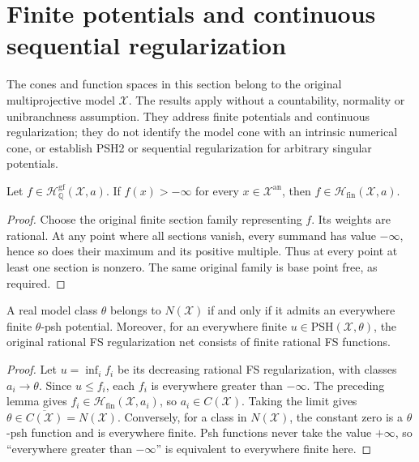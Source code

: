 \section{Finite potentials and continuous sequential regularization}
\label{sec:intrinsic-psh-continuation-seven}

The cones and function spaces in this section belong to the original
multiprojective model $\mathcal X$. The results apply without a countability,
normality or unibranchness assumption. They address finite potentials and
continuous regularization; they do not identify the model cone with an
intrinsic numerical cone, or establish PSH2 or sequential regularization
for arbitrary singular potentials.

\begin{lemma}
\label{lem:seven-finite-rational-fs}
\leanok
Let $f\in\mathcal H^{\mathrm{gf}}_{\mathbb Q}(\mathcal X,a)$.
If $f(x)>-\infty$ for every $x\in\mathcal X^{\mathrm{an}}$, then
$f\in\mathcal H_{\mathrm{fin}}(\mathcal X,a)$.
\end{lemma}
\begin{proof}
Choose the original finite section family representing $f$. Its weights
are rational. At any point where all sections vanish, every summand has
value $-\infty$, hence so does their maximum and its positive multiple.
Thus at every point at least one section is nonzero. The same original
family is base point free, as required.
\end{proof}

\begin{theorem}
\label{thm:seven-finite-psh-nef}
\leanok
A real model class $\theta$ belongs to $N(\mathcal X)$ if and only if it
admits an everywhere finite $\theta$-psh potential. Moreover, for an
everywhere finite $u\in\mathrm{PSH}(\mathcal X,\theta)$, the original
rational FS regularization net consists of finite rational FS functions.
\end{theorem}
\begin{proof}
Let $u=\inf_i f_i$ be its decreasing rational FS regularization,
with classes $a_i\to\theta$. Since $u\le f_i$, each $f_i$ is everywhere
greater than $-\infty$. The preceding lemma gives
$f_i\in\mathcal H_{\mathrm{fin}}(\mathcal X,a_i)$, so
$a_i\in C(\mathcal X)$. Taking the limit gives
$\theta\in\overline{C(\mathcal X)}=N(\mathcal X)$.
Conversely, for a class in $N(\mathcal X)$, the constant zero is a
$\theta$-psh function and is everywhere finite. Psh functions never take
the value $+\infty$, so ``everywhere greater than $-\infty$'' is equivalent
to everywhere finite here.
\end{proof}

